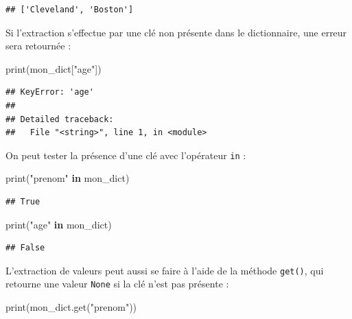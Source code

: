 \documentclass[12pt,]{book}
\newenvironment{Shaded}{\begin{snugshade}}{\end{snugshade}}
\newcommand{\KeywordTok}[1]{\textcolor[rgb]{0.13,0.29,0.53}{\textbf{#1}}}
\newcommand{\StringTok}[1]{\textcolor[rgb]{0.31,0.60,0.02}{#1}}
\newcommand{\BuiltInTok}[1]{#1}
\newcommand{\NormalTok}[1]{#1}
\numberwithin{equation}{section}
\numberwithin{countremarque}{section}
\begin{document}
\begin{lstlisting}
## ['Cleveland', 'Boston']
\end{lstlisting}

Si l'extraction s'effectue par une clé non présente dans le
dictionnaire, une erreur sera retournée :

\begin{Shaded}
\begin{Highlighting}[]
\BuiltInTok{print}\NormalTok{(mon_dict[}\StringTok{"age"}\NormalTok{])}
\end{Highlighting}
\end{Shaded}

\begin{lstlisting}
## KeyError: 'age'
## 
## Detailed traceback: 
##   File "<string>", line 1, in <module>
\end{lstlisting}

On peut tester la présence d'une clé avec l'opérateur \texttt{in} :

\begin{Shaded}
\begin{Highlighting}[]
\BuiltInTok{print}\NormalTok{(}\StringTok{"prenom"} \KeywordTok{in}\NormalTok{ mon_dict)}
\end{Highlighting}
\end{Shaded}

\begin{lstlisting}
## True
\end{lstlisting}

\begin{Shaded}
\begin{Highlighting}[]
\BuiltInTok{print}\NormalTok{(}\StringTok{"age"} \KeywordTok{in}\NormalTok{ mon_dict)}
\end{Highlighting}
\end{Shaded}

\begin{lstlisting}
## False
\end{lstlisting}

L'extraction de valeurs peut aussi se faire à l'aide de la méthode
\texttt{get()}, qui retourne une valeur \texttt{None} si la clé n'est
pas présente :

\begin{Shaded}
\begin{Highlighting}[]
\BuiltInTok{print}\NormalTok{(mon_dict.get(}\StringTok{"prenom"}\NormalTok{))}
\end{Highlighting}
\end{Shaded}
\end{document}
